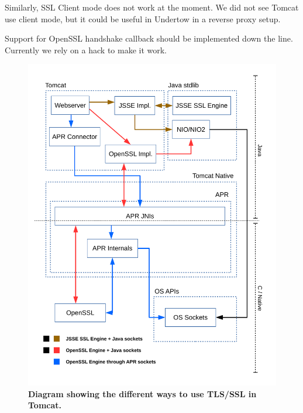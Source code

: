\documentclass[11pt,a4paper,bibliography=totocnumbered]{scrartcl}
\begin{document}
Similarly, SSL Client mode does not work at the moment. We did not see Tomcat use client mode, but it could be useful in Undertow in a reverse proxy setup.

Support for OpenSSL handshake callback should be implemented down the line. Currently we rely on a hack to make it work.
\newpage
\printbibliography

\begin{figure}[!h]
	\begin{center}
		\includegraphics[scale=0.7]{diagram_current_way.pdf}
	\end{center}
	\caption{\textbf{Diagram showing the different ways to use TLS/SSL in Tomcat.}}
	\label{fig:current}
\end{figure}
\end{document}
